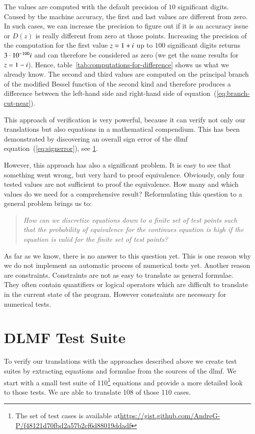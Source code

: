 The values are computed with the default precision of $10$ significant digits. Caused by the machine accuracy, the first and last values are different from zero. In such cases, we can increase the precision to figure out if it is an accuracy issue or $D(z)$ is really different from zero at those points. Increasing the precision of the computation for the first value $z = 1+{i}$ up to $100$ significant digits returns $3\cdot 10^{-100} {i}$ and can therefore be considered as zero (we get the same results for $z = 1-{i}$). Hence, table~\ref{tab:computations-for-difference} shows us what we already know. The second and third values are computed on the principal branch of the modified Bessel function of the second kind and therefore produces a difference between the left-hand side and right-hand side of equation~(\ref{eq:branch-cut-near}).

This approach of verification is very powerful, because it can verify not only our translations but also equations in a mathematical compendium. This has been demonstrated by discovering an overall sign error of the \gls{dlmf} equation~(\ref{eq:signerror}), see \cref{sec:test-summary}.

However, this approach has also a significant problem. It is easy to see that something went wrong, but very hard to proof equivalence. Obviously, only four tested values are not sufficient to proof the equivalence. How many and which values do we need for a comprehensive result? Reformulating this question to a general problem brings us to: 
\begin{quote}
\textit{How can we discretize equations down to a finite set of test points such that the probability of equivalence for the continues equation is high if the equation is valid for the finite set of test points?}
\end{quote}
As far as we know, there is no answer to this question yet. This is one reason why we do not implement an automatic process of numerical tests yet. Another reason are constraints. Constraints are not as easy to translate as general formulae. They often contain quantifiers or logical operators which are difficult to translate in the current state of the program. However constraints are necessary for numerical tests. 

\section{DLMF Test Suite}\label{sec:test-summary}
To verify our translations with the approaches described above we create test suites by extracting equations and formulae from the sources of the \gls{dlmf}. We start with a small test suite of 110\footnote{The set of test cases is available at\newline \url{https://gist.github.com/AndreG-P/f48121d70fbd2a57b2cf6d88019ddadf}} equations and provide a more detailed look to those tests. We are able to translate 108 of those 110 cases. 

